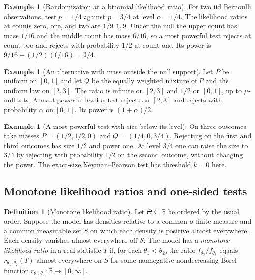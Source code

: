 \documentclass[11pt,oneside]{book}
\theoremstyle{definition}
\newtheorem{definition}[theorem]{Definition}
\newtheorem{example}[theorem]{Example}
\theoremstyle{remark}
\newcommand{\R}{\mathbb R}
\begin{document}
\begin{example}[Randomization at a binomial likelihood ratio]
\label{ex:np-two-bernoulli}
For two iid Bernoulli observations, test $p=1/4$ against $p=3/4$
at level $\alpha=1/4$. The likelihood ratios at counts zero,
one, and two are $1/9,1,9$. Under the null the upper count
has mass $1/16$ and the middle count has mass $6/16$, so a
most powerful test rejects at count two and rejects with
probability $1/2$ at count one. Its power is
$9/16+(1/2)(6/16)=3/4$.
\end{example}

\begin{example}[An alternative with mass outside the null support]
\label{ex:np-singular-alternative}
Let $P$ be uniform on $[0,1]$ and let $Q$ be the equally weighted
mixture of $P$ and the uniform law on $[2,3]$. The ratio is
infinite on $[2,3]$ and $1/2$ on $[0,1]$, up to $\mu$-null sets.
A most powerful level-$\alpha$ test rejects on $[2,3]$ and
rejects with probability $\alpha$ on $[0,1]$. Its power is
$(1+\alpha)/2$.
\end{example}

\begin{example}[A most powerful test with size below its level]
\label{ex:np-unused-size}
On three outcomes take masses $P=(1/2,1/2,0)$ and
$Q=(1/4,0,3/4)$. Rejecting on the first and third outcomes
has size $1/2$ and power one. At level $3/4$ one can raise the
size to $3/4$ by rejecting with probability $1/2$ on the
second outcome, without changing the power. The exact-size
Neyman--Pearson test has threshold $k=0$ here.
\end{example}

\subsection{Monotone likelihood ratios and one-sided tests}
\label{subsec:monotone-likelihood-ratio}

\begin{definition}[Monotone likelihood ratio]
\label{def:monotone-likelihood-ratio}
Let $\Theta\subseteq\R$ be ordered by the usual order. Suppose the
model has densities relative to a common $\sigma$-finite measure
and a common measurable set $S$ on which each density is positive
almost everywhere. Each density vanishes almost everywhere off $S$.
The model has a \emph{monotone likelihood ratio} in a real statistic
$T$ if, for each $\theta_1<\theta_2$, the ratio
$f_{\theta_2}/f_{\theta_1}$ equals $r_{\theta_1,\theta_2}(T)$
almost everywhere on $S$ for some nonnegative nondecreasing
Borel function $r_{\theta_1,\theta_2}:\R\to[0,\infty]$.
\end{definition}
\end{document}
